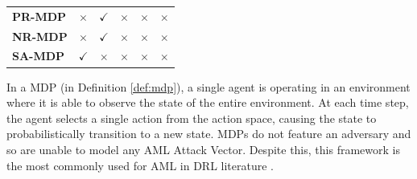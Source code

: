 \documentclass[conference,compsoc]{IEEEtran}
\begin{document}
\begin{table}[ht]
\begin{tabulary}{1.0\textwidth}{lccccc}
\textbf{PR-MDP \cite{tessler_action_2019}}                                                    & $\times$                        & $\checkmark$                  & $\times$                         & $\times$                       & $\times$                           \\ 
\textbf{NR-MDP \cite{tessler_action_2019}}                                                            & $\times$                        & $\checkmark$                  & $\times$                         & $\times$                       & $\times$                           \\ 
\textbf{SA-MDP \cite{zhang_robust_2020-1}}                                                                                        & $\checkmark$                       & $\times$                   & $\times$                          & $\times$                       & $\times$                           \\ 
\hline
\end{tabulary}

\label{tab:models}
\end{table}


In a MDP \cite{bellman_markovian_1957} (in Definition \ref{def:mdp}), a single agent is operating in an environment where it is able to observe the state of the entire environment. At each time step, the agent selects a single action from the action space, causing the state to probabilistically transition to a new state. MDPs do not feature an adversary and so are unable to model any AML Attack Vector. Despite this, this framework is the most commonly used for AML in DRL literature \cite{ying_towards_2021,kim_trc_2022,inkawhich_snooping_2020,chen_understanding_2021,zheng_vulnerability_2021,behzadan_vulnerability_2017,behzadan_whatever_2017,sun_who_2021,wang_adversarial_2020,korkmaz_daylight_2020,weng_toward_2020,chan_adversarial_2020,wu_adversarial_2021,qu_adversary_2021,qu_attacking_2021,everett_certifiable_2021,hussenot_copycat_2020,praveen_kumar_critical_2021,wu_crop_2022,ohashi_deep_2021,guo_edge_2021,garcia_instance-based_2022,huai_malicious_2020,lee_query-based_2021,oikarinen_robust_2021,tretschk_sequential_2018,lee_spatiotemporally_2020,sun_stealthy_2020,lin_tactics_2017,buddareddygari_targeted_2021}.
\end{document}
